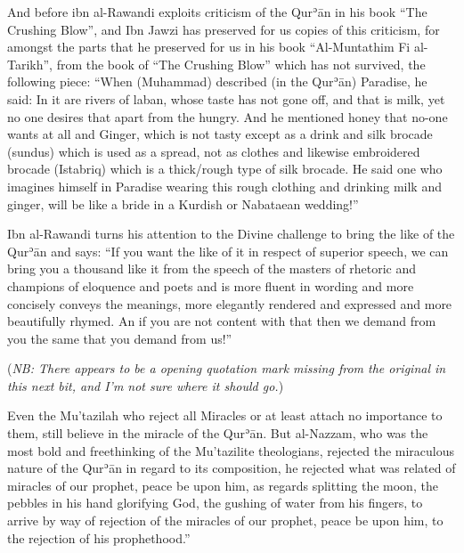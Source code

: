\documentclass[12pt]{book}
\def \Quran{Qurʾān} %
\def \Qrn{\Quran}   %
\newcommand{\NB}[1]{\emph{\small NB: #1}}
\begin{document}

And before ibn al-Rawandi exploits criticism of the \Qrn{} in his book “The
Crushing Blow”, and Ibn Jawzi has preserved for us copies of this criticism,
for amongst the parts that he preserved for us in his book “Al-Muntathim Fi
al-Tarikh”, from the book of “The Crushing Blow” which has not survived, the
following piece: “When (Muhammad) described (in the \Quran) Paradise, he said:
In it are rivers of laban, whose taste has not gone off, and that is milk, yet
no one desires that apart from the hungry. And he mentioned honey that no-one
wants at all and Ginger, which is not tasty except as a drink and silk brocade
(sundus) which is used as a spread, not as clothes and likewise embroidered
brocade (Istabriq) which is a thick/rough type of silk brocade. He said one who
imagines himself in Paradise wearing this rough clothing and drinking milk and
ginger, will be like a bride in a Kurdish or Nabataean wedding!”\footnotemark


Ibn al-Rawandi turns his attention to the Divine challenge to bring the like of
the \Qrn{} and says: “If you want the like of it in respect of superior speech,
we can bring you a thousand like it from the speech of the masters of rhetoric
and champions of eloquence and poets and is more fluent in wording and more
concisely conveys the meanings, more elegantly rendered and expressed and more
beautifully rhymed. An if you are not content with that then we demand from you
the same that you demand from us!”\footnotemark


(\NB{There appears to be a opening quotation mark missing from the original in
this next bit, and I’m not sure where it should go.})

Even the Mu’tazilah who reject all Miracles or at least attach no importance to
them, still believe in the miracle of the \Quran.\footnotemark
{}
But al-Nazzam, who was the most bold and freethinking of the Mu’tazilite
theologians, rejected the miraculous nature of the \Qrn{} in regard to its
composition, he rejected what was related of miracles of our prophet, peace be
upon him, as regards splitting the moon, the pebbles in his hand glorifying
God, the gushing of water from his fingers, to arrive by way of rejection of
the miracles of our prophet, peace be upon him, to the rejection of his
prophethood.”\footnotemark
\end{document}
